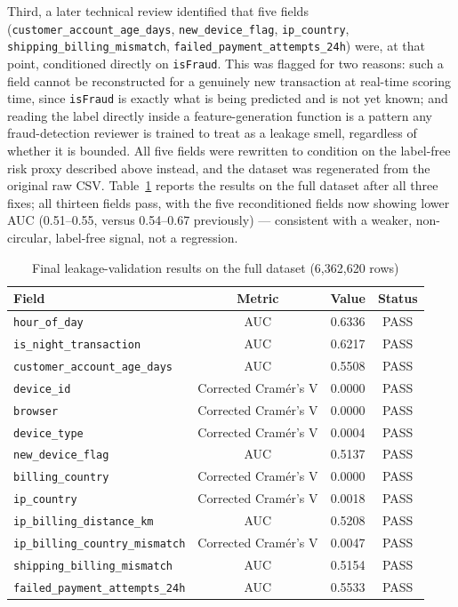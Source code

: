 Third, a later technical review identified that five fields (\texttt{customer\_account\_age\_days}, \texttt{new\_device\_flag}, \texttt{ip\_country}, \texttt{shipping\_billing\_mismatch}, \texttt{failed\_payment\_attempts\_24h}) were, at that point, conditioned directly on \texttt{isFraud}. This was flagged for two reasons: such a field cannot be reconstructed for a genuinely new transaction at real-time scoring time, since \texttt{isFraud} is exactly what is being predicted and is not yet known; and reading the label directly inside a feature-generation function is a pattern any fraud-detection reviewer is trained to treat as a leakage smell, regardless of whether it is bounded. All five fields were rewritten to condition on the label-free risk proxy described above instead, and the dataset was regenerated from the original raw CSV. Table~\ref{tab:leakage-results} reports the results on the full dataset after all three fixes; all thirteen fields pass, with the five reconditioned fields now showing lower AUC (0.51--0.55, versus 0.54--0.67 previously) --- consistent with a weaker, non-circular, label-free signal, not a regression.

\begin{table}[htbp]
\centering
\caption{Final leakage-validation results on the full dataset (6,362,620 rows)}
\label{tab:leakage-results}
\footnotesize
\begin{tabular}{@{}lccc@{}}
\toprule
\textbf{Field} & \textbf{Metric} & \textbf{Value} & \textbf{Status} \\
\midrule
\texttt{hour\_of\_day} & AUC & 0.6336 & PASS \\
\texttt{is\_night\_transaction} & AUC & 0.6217 & PASS \\
\texttt{customer\_account\_age\_days} & AUC & 0.5508 & PASS \\
\texttt{device\_id} & Corrected Cram\'er's V & 0.0000 & PASS \\
\texttt{browser} & Corrected Cram\'er's V & 0.0000 & PASS \\
\texttt{device\_type} & Corrected Cram\'er's V & 0.0004 & PASS \\
\texttt{new\_device\_flag} & AUC & 0.5137 & PASS \\
\texttt{billing\_country} & Corrected Cram\'er's V & 0.0000 & PASS \\
\texttt{ip\_country} & Corrected Cram\'er's V & 0.0018 & PASS \\
\texttt{ip\_billing\_distance\_km} & AUC & 0.5208 & PASS \\
\texttt{ip\_billing\_country\_mismatch} & Corrected Cram\'er's V & 0.0047 & PASS \\
\texttt{shipping\_billing\_mismatch} & AUC & 0.5154 & PASS \\
\texttt{failed\_payment\_attempts\_24h} & AUC & 0.5533 & PASS \\
\bottomrule
\end{tabular}
\end{table}

